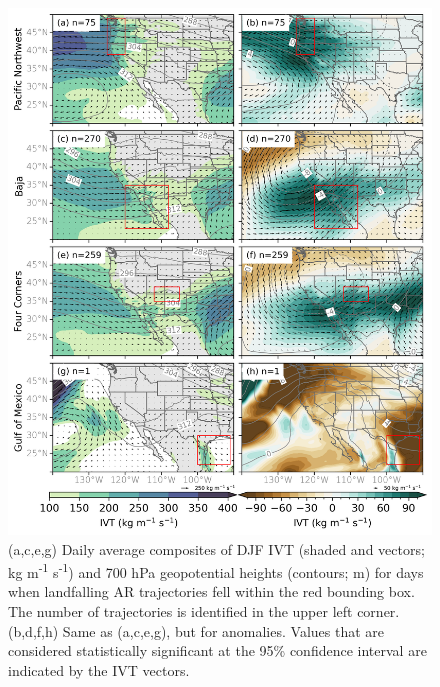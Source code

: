 \documentclass[jgrga]{agutexSI2019}
\begin{document}
\begin{article}
\begin{figure}
\noindent\includegraphics[scale=0.8]{figS7.png}
\caption{(a,c,e,g) Daily average composites of DJF IVT (shaded and vectors; kg m\textsuperscript{-1} s\textsuperscript{-1}) and 700 hPa geopotential heights (contours; m) for days when landfalling AR trajectories fell within the red bounding box. The number of trajectories is identified in the upper left corner. (b,d,f,h) Same as (a,c,e,g), but for anomalies. Values that are considered statistically significant at the 95\% confidence interval are indicated by the IVT vectors.}
\label{fig:supp:composites_DJF}
\end{figure}
\clearpage


\end{article}
\end{document}
